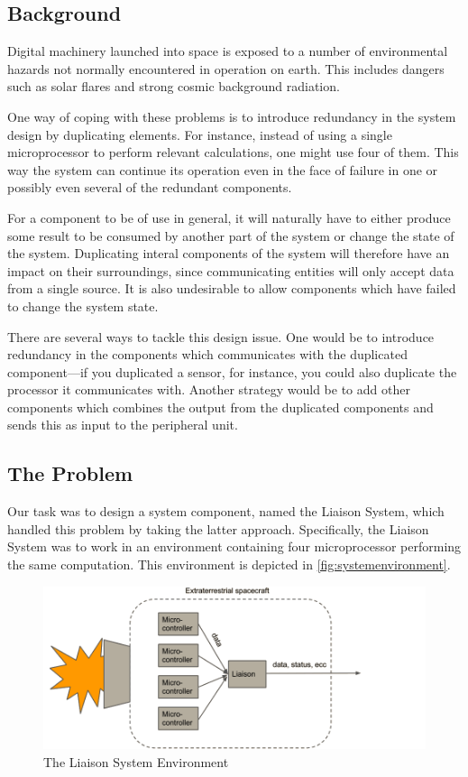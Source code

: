 \subsection{Background}
Digital machinery launched into space is exposed to a number of
environmental hazards not normally encountered in operation on
earth. This includes dangers such as solar flares and strong cosmic
background radiation.\cite{nasa}

One way of coping with these problems is to introduce redundancy in
the system design by duplicating elements. For instance, instead of
using a single microprocessor to perform relevant calculations, one
might use four of them. This way the system can continue its operation
even in the face of failure in one or possibly even several of the
redundant components.

For a component to be of use in general, it will naturally have to
either produce some result to be consumed by another part of the
system or change the state of the system. Duplicating interal
components of the system will therefore have an impact on their
surroundings, since communicating entities will only accept data from
a single source. It is also undesirable to allow components which have
failed to change the system state.

There are several ways to tackle this design issue. One would be to
introduce redundancy in the components which communicates with the
duplicated component---if you duplicated a sensor, for instance, you
could also duplicate the processor it communicates with. Another
strategy would be to add other components which combines the output
from the duplicated components and sends this as input to the
peripheral unit.

\subsection{The Problem}
\label{sec:problem}
Our task was to design a system component, named the Liaison System,
which handled this problem by taking the latter
approach. Specifically, the Liaison System was to work in an
environment containing four microprocessor performing the same
computation. This environment is depicted in
\autoref{fig:systemenvironment}. 

\begin{figure}[H]
    \includegraphics[width=15cm]{fig_system_env}
    \caption{The Liaison System Environment}
    \label{fig:systemenvironment}
\end{figure}

